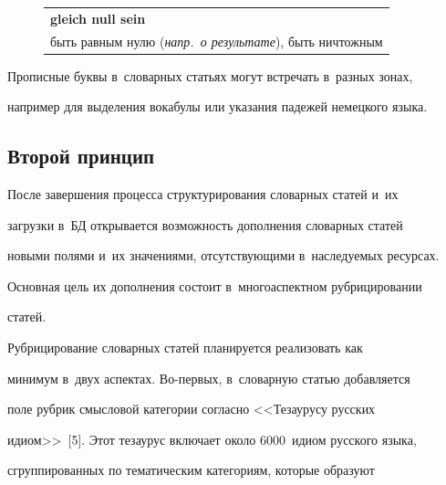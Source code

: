 \begin{figure}[h] %


\vspace*{6pt}



{\small 

\begin{tabular}{p{120mm}}

\textbf{gleich null sein}\\

быть равным нулю (\textit{напр.\ о результате}), быть ничтожным\\

\hline

\end{tabular}

}

\end{figure}



   Прописные буквы в~словарных статьях могут встречать в~разных зонах, 

например для выделения вокабулы или указания падежей немецкого языка.



\subsection{Второй принцип}



     После завершения процесса структурирования словарных статей и~их 

загрузки в~БД открывается возможность дополнения словарных статей 

новыми полями и~их значениями, отсутствующими в~наследуемых ресурсах. 

Основная цель их дополнения состоит в~многоаспектном рубрицировании 

статей.

     

     Рубрицирование словарных статей планируется реализовать как 

минимум в~двух аспектах. Во-пер\-вых, в~словарную статью добавляется 

поле рубрик смысловой категории согласно <<Тезаурусу русских 

идиом>>~[5]. Этот тезаурус включает около 6000~идиом русского языка, 

сгруппированных по тематическим категориям, которые образуют 

